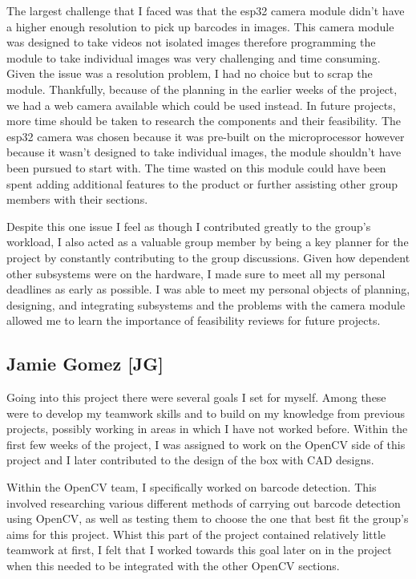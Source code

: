 The largest challenge that I faced was that the esp32 camera module didn't have a higher enough resolution to pick up barcodes in images.
This camera module was designed to take videos not isolated images therefore programming the module to take individual images was very challenging and time consuming.
Given the issue was a resolution problem, I had no choice but to scrap the module.
Thankfully, because of the planning in the earlier weeks of the project, we had a web camera available which could be used instead.
In future projects, more time should be taken to research the components and their feasibility.
The esp32 camera was chosen because it was pre-built on the microprocessor however because it wasn't designed to take individual images, the module shouldn't have been pursued to start with.
The time wasted on this module could have been spent adding additional features to the product or further assisting other group members with their sections.

Despite this one issue I feel as though I contributed greatly to the group's workload, I also acted as a valuable group member by being a key planner for the project by constantly contributing to the group discussions.
Given how dependent other subsystems were on the hardware, I made sure to meet all my personal deadlines as early as possible.
I was able to meet my personal objects of planning, designing, and integrating subsystems and the problems with the camera module allowed me to learn the importance of feasibility reviews for future projects.

\subsection{Jamie Gomez [JG]}
Going into this project there were several goals I set for myself.
Among these were to develop my teamwork skills and to build on my knowledge from previous projects, possibly working in areas in which I have not worked before.
Within the first few weeks of the project, I was assigned to work on the OpenCV side of this project and I later contributed to the design of the box with CAD designs.

Within the OpenCV team, I specifically worked on barcode detection.
This involved researching various different methods of carrying out barcode detection using OpenCV, as well as testing them to choose the one that best fit the group's aims for this project.
Whist this part of the project contained relatively little teamwork at first, I felt that I worked towards this goal later on in the project when this needed to be integrated with the other OpenCV sections.

